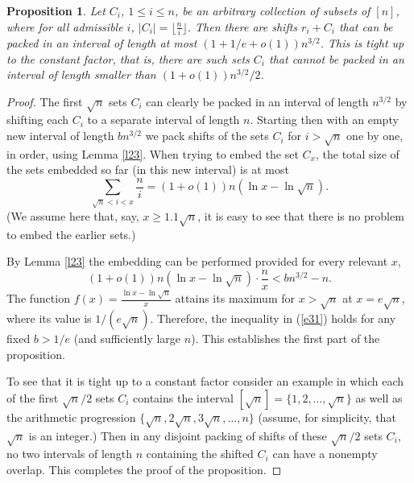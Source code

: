 \documentclass[10pt,a4paper]{amsart}
\newtheorem{proposition}{Proposition}
\begin{document}
\begin{proposition}
	\label{p32}
	Let $C_i$, $1 \leqslant i \leqslant n$, be an arbitrary collection of subsets of $[n]$, where for all admissible $i$, $|C_i|=\lfloor \frac{n}{i} \rfloor$. Then there are shifts $r_i+C_i$ that can be packed in an interval
	of length at most $(1+1/e+o(1))n^{3/2}$. This is tight up to the constant factor, that is, there are such sets $C_i$ that cannot be packed in an interval of length smaller than $(1+o(1))n^{3/2}/2$.
\end{proposition}

\begin{proof}
	The first $\sqrt n$ sets $C_i$ can clearly be packed in an interval of length $n^{3/2}$ by shifting each $C_i$ to a separate interval of length $n$. Starting  then with an empty new interval of length 
	$bn^{3/2}$ we pack shifts of the sets $C_i$ for $i > \sqrt n$ one by one, in order, using Lemma \ref{l23}. When trying to embed the set $C_x$, the total size of the sets embedded so far (in this new interval) is
	at most 
	$$
	\sum_{\sqrt n < i<x} \frac{n}{i} =
	(1+o(1)) n (\ln x - \ln {\sqrt n}).
	$$
	(We assume here that, say, $x \geqslant 1.1 \sqrt n $, it is easy to see that there is no problem to embed the earlier sets.)
	
	By Lemma \ref{l23} the embedding can be performed provided for every relevant $x$,
	\begin{equation}
		\label{e31}
		(1+o(1)) n (\ln x - \ln {\sqrt n}) \cdot \frac{n}{x} < b n^{3/2}-n.
	\end{equation}
	The function $f(x)=\frac{\ln x -\ln \sqrt n}{x}$ attains its maximum for $x > \sqrt n$ at $x=e \sqrt n$, where its value is $1/(e \sqrt n)$. Therefore, the inequality in (\ref{e31}) holds for any fixed $b>1/e$ (and sufficiently large $n$). This establishes the first part of the proposition.
	
	To see that it is tight up to a constant factor consider an example in which each of the first $\sqrt n/2$ sets $C_i$ contains the interval	$[\sqrt n]=\{1,2, \ldots ,\sqrt n\}$ as well as the arithmetic progression $\{\sqrt n, 2 \sqrt n, 3 \sqrt n, \ldots,n\}$ (assume, for simplicity, that $\sqrt n $ is an integer.) Then in any disjoint packing of shifts of these $\sqrt n/2$ sets $C_i$, no two intervals of length $n$ containing the shifted $C_i$ can have a nonempty overlap. This completes the proof of the proposition.
\end{proof}
\end{document}
